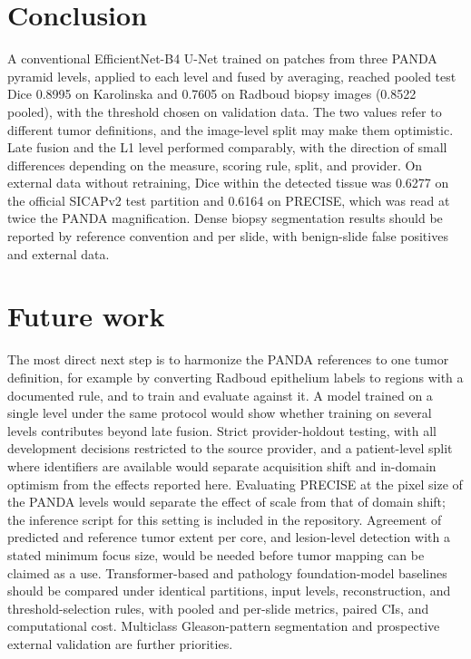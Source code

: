 \documentclass[10pt,letterpaper]{article}
\begin{document}
\section*{Conclusion}
A conventional EfficientNet-B4 U-Net trained on patches from three PANDA pyramid levels, applied to each level and fused by averaging, reached pooled test Dice 0.8995 on Karolinska and 0.7605 on Radboud biopsy images (0.8522 pooled), with the threshold chosen on validation data. The two values refer to different tumor definitions, and the image-level split may make them optimistic. Late fusion and the L1 level performed comparably, with the direction of small differences depending on the measure, scoring rule, split, and provider. On external data without retraining, Dice within the detected tissue was 0.6277 on the official SICAPv2 test partition and 0.6164 on PRECISE, which was read at twice the PANDA magnification. Dense biopsy segmentation results should be reported by reference convention and per slide, with benign-slide false positives and external data.

\section*{Future work}
The most direct next step is to harmonize the PANDA references to one tumor definition, for example by converting Radboud epithelium labels to regions with a documented rule, and to train and evaluate against it. A model trained on a single level under the same protocol would show whether training on several levels contributes beyond late fusion. Strict provider-holdout testing, with all development decisions restricted to the source provider, and a patient-level split where identifiers are available would separate acquisition shift and in-domain optimism from the effects reported here. Evaluating PRECISE at the pixel size of the PANDA levels would separate the effect of scale from that of domain shift; the inference script for this setting is included in the repository. Agreement of predicted and reference tumor extent per core, and lesion-level detection with a stated minimum focus size, would be needed before tumor mapping can be claimed as a use. Transformer-based and pathology foundation-model baselines should be compared under identical partitions, input levels, reconstruction, and threshold-selection rules, with pooled and per-slide metrics, paired CIs, and computational cost. Multiclass Gleason-pattern segmentation and prospective external validation are further priorities.
\end{document}
